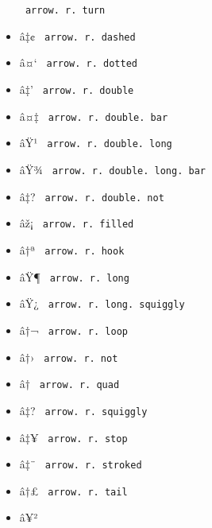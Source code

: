 \begin{itemize}
{  \texttt{\ arrow.\ r.\ turn\ }}
\item
  \label{symbol-arrow.r.dashed}{{ â‡¢ }
  \texttt{\ arrow.\ r.\ dashed\ }}
\item
  \label{symbol-arrow.r.dotted}{{ â¤` }
  \texttt{\ arrow.\ r.\ dotted\ }}
\item
  \label{symbol-arrow.r.double}{{ â‡' }
  \texttt{\ arrow.\ r.\ double\ }}
\item
  \label{symbol-arrow.r.double.bar}{{ â¤‡ }
  \texttt{\ arrow.\ r.\ double.\ bar\ }}
\item
  \label{symbol-arrow.r.double.long}{{ âŸ¹ }
  \texttt{\ arrow.\ r.\ double.\ long\ }}
\item
  \label{symbol-arrow.r.double.long.bar}{{ âŸ¾ }
  \texttt{\ arrow.\ r.\ double.\ long.\ bar\ }}
\item
  \label{symbol-arrow.r.double.not}{{ â‡? }
  \texttt{\ arrow.\ r.\ double.\ not\ }}
\item
  \label{symbol-arrow.r.filled}{{ âž¡ }
  \texttt{\ arrow.\ r.\ filled\ }}
\item
  \label{symbol-arrow.r.hook}{{ â†ª }
  \texttt{\ arrow.\ r.\ hook\ }}
\item
  \label{symbol-arrow.r.long}{{ âŸ¶ }
  \texttt{\ arrow.\ r.\ long\ }}
\item
  \label{symbol-arrow.r.long.squiggly}{{ âŸ¿ }
  \texttt{\ arrow.\ r.\ long.\ squiggly\ }}
\item
  \label{symbol-arrow.r.loop}{{ â†¬ }
  \texttt{\ arrow.\ r.\ loop\ }}
\item
  \label{symbol-arrow.r.not}{{ â†› }
  \texttt{\ arrow.\ r.\ not\ }}
\item
  \label{symbol-arrow.r.quad}{{ â­† }
  \texttt{\ arrow.\ r.\ quad\ }}
\item
  \label{symbol-arrow.r.squiggly}{{ â‡? }
  \texttt{\ arrow.\ r.\ squiggly\ }}
\item
  \label{symbol-arrow.r.stop}{{ â‡¥ }
  \texttt{\ arrow.\ r.\ stop\ }}
\item
  \label{symbol-arrow.r.stroked}{{ â‡¨ }
  \texttt{\ arrow.\ r.\ stroked\ }}
\item
  \label{symbol-arrow.r.tail}{{ â†£ }
  \texttt{\ arrow.\ r.\ tail\ }}
\item
  \label{symbol-arrow.r.tilde}{{ â¥² }
}
\end{itemize}
